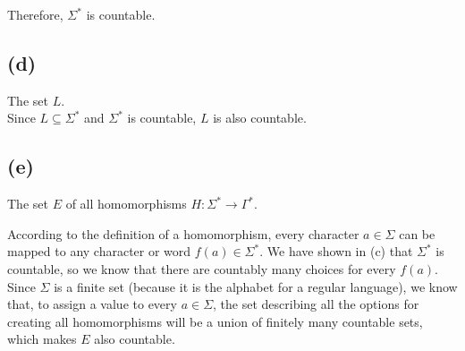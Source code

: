 Therefore, $\Sigma^{\ast}$ is countable.

\subsection{(d)}
The set $L$.\\
Since $L \subseteq \Sigma^{\ast}$ and $\Sigma^{\ast}$ is countable, $L$ is also countable.

\subsection{(e)}
The set $E$ of all homomorphisms $H:\Sigma^{\ast}\rightarrow\Gamma^{\ast}$.

According to the definition of a homomorphism, every character $a \in \Sigma$ can be mapped to any character or word $f(a) \in \Sigma^{\ast}$. We have shown in (c) that $\Sigma^{\ast}$ is countable, so we know that there are countably many choices for every $f(a)$.\\
Since $\Sigma$ is a finite set (because it is the alphabet for a regular language), we know that, to assign a value to every $a \in \Sigma$, the set describing all the options for creating all homomorphisms will be a union of finitely many countable sets, which makes $E$ also countable.


